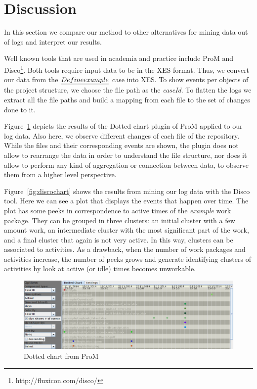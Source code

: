 \section{Discussion}\label{sec:discuss}

In this section we compare our method to other alternatives for mining data out of logs and interpret our results.

Well known tools that are used in academia and practice include ProM \citep{van2005prom} and Disco\footnote{http://fluxicon.com/disco/}. Both tools require input data to be in the XES \citep{verbeek2010xes} format. Thus, we convert our data from the $\emph{Define example}$ case into XES. To show events per objects of the project structure, we choose the file path as the \emph{caseId}. To flatten the logs we extract all the file paths and build a mapping from each file to the set of changes done to it.

Figure~\ref{fig:dottedchart} depicts the results of the Dotted chart plugin of ProM applied to our log data. Also here, we observe different changes of each file of the repository. While the files and their corresponding events are shown, the plugin does not allow to rearrange the data in order to understand the file structure, nor does it allow to perform any kind of aggregation or connection between data, to observe them from a higher level perspective.

Figure~\ref{fig:discochart} shows the results from mining our log data with the Disco tool. Here we can see a plot that displays the events that happen over time. The plot has some peeks in correspondence to active times of the \emph{example} work package. They can be grouped in three clusters: an initial cluster with a few amount work, an intermediate cluster with the most significant part of the work, and a final cluster that again is not very active. In this way, clusters can be associated to activities. As a drawback, when the number of work packages and activities increase, the number of peeks grows and generate identifying clusters of activities by look at active (or idle) times becomes unworkable.

\begin{figure}
\centering
\includegraphics[width=\textwidth]{bpm2015/imgs/dotted_chart_ordered_by_taskID_cut}
\caption{Dotted chart from ProM}
\label{fig:dottedchart}
\end{figure}


